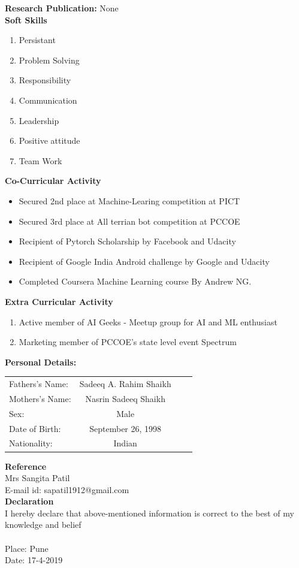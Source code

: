 \documentclass[10pt,twoside,a4paper]{article}
\begin{document}
\noindent
\textbf{Research Publication:}
None\\

\newpage
\noindent
\textbf{Soft Skills}
\begin{enumerate}
\item Persistant
\item Problem Solving
\item Responsibility
\item Communication
\item Leadership
\item Positive attitude
\item Team Work 
\\
\end{enumerate}

\noindent
\textbf{Co-Curricular Activity}
\begin{itemize}
\item Secured 2nd place at Machine-Learing competition at PICT
\item Secured 3rd place at All terrian bot competition at PCCOE 
\item Recipient of Pytorch Scholarship by Facebook and Udacity
\item Recipient of Google India Android challenge by Google and Udacity
\item Completed Coursera Machine Learning course By Andrew NG.\\
\end{itemize}


\noindent
\textbf{Extra Curricular Activity}
\begin{enumerate}
\item Active member of AI Geeks - Meetup group for AI and ML enthusiast
\item Marketing member of PCCOE's state level event Spectrum\\
\end{enumerate}

\noindent
\textbf{Personal Details:}
\begin{flushleft}
\begin{tabular}{l c c l}
Fathers\rq{}s Name: & Sadeeq A. Rahim Shaikh\\
Mothers\rq{}s Name:& Nasrin Sadeeq Shaikh\\
Sex:&Male\\
Date of Birth:& September 26, 1998 \\
Nationality:& Indian\\
\end{tabular}
\end{flushleft}

\noindent
\textbf{Reference}
\\
Mrs Sangita Patil\\
E-mail id: sapatil1912@gmail.com\\

\noindent
\textbf{Declaration}
\\
I hereby declare that above-mentioned information is correct to the best of my knowledge and belief\\
\\
Place: Pune\\
Date: 17-4-2019
\end{document}
